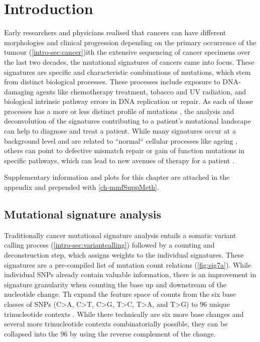 \section{Introduction}
\label{mmf-sec:intro}

Early researchers and physicians realised that cancers can have different morphologies and clinical progression depending on the primary occurrence of the tumour (\autoref{intro-sec:cancer})ith the extensive sequencing of cancer specimens over the last two decades, the mutational signatures of cancers came into focus. These signatures are specific and characteristic combinations of mutations, which stem from distinct biological processes. These processes include exposure to DNA-damaging agents like chemotherapy treatment, tobacco and UV radiation, and biological intrinsic pathway errors in DNA replication or repair. As each of those processes has a more or less distinct profile of mutations \cite{Hollstein1991,Kucab2019}, the analysis and deconvolution of the signatures contributing to a patient's mutational landscape can help to diagnose and treat a patient. While many signatures occur at a background level and are related to ``normal`` cellular processes like ageing \cite{Alexandrov2013}, others can point to defective mismatch repair or gain of function mutations in specific pathways, which can lead to new avenues of therapy for a patient \cite{Neil2017}.

Supplementary information and plots for this chapter are attached in the appendix and prepended with \ref{ch-mmfSuppMeth}.

\subsection{Mutational signature analysis}
\label{mmf-sec:signatureanalysis}
Traditionally cancer mutational signature analysis entails a somatic variant calling process (\autoref{intro-sec:variantcalling}) followed by a counting and deconstruction step, which assigns weights to the individual signatures. These signatures are a pre-compiled list of mutation count relations (\autoref{fig:sig7a}). While individual SNPs already contain valuable information, there is an improvement in signature granularity when counting the base up and downstream of the nucleotide change. Th expand the feature space of counts from the six base classes of SNPs (C>A, C>T, C>G, T>C, T>A, and T>G) to 96 unique trinucleotide contexts \cite{Alexandrov2013}. While there technically are six more base changes and several  more trinucleotide contexts combinatorially possible, they can be collapsed into the  96  by using the reverse complement of the change.

